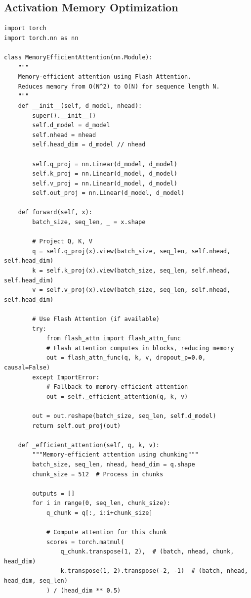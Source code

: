 \subsection{Activation Memory Optimization}

\begin{lstlisting}[style=python, caption=Techniques for reducing activation memory]
import torch
import torch.nn as nn

class MemoryEfficientAttention(nn.Module):
    """
    Memory-efficient attention using Flash Attention.
    Reduces memory from O(N^2) to O(N) for sequence length N.
    """
    def __init__(self, d_model, nhead):
        super().__init__()
        self.d_model = d_model
        self.nhead = nhead
        self.head_dim = d_model // nhead

        self.q_proj = nn.Linear(d_model, d_model)
        self.k_proj = nn.Linear(d_model, d_model)
        self.v_proj = nn.Linear(d_model, d_model)
        self.out_proj = nn.Linear(d_model, d_model)

    def forward(self, x):
        batch_size, seq_len, _ = x.shape

        # Project Q, K, V
        q = self.q_proj(x).view(batch_size, seq_len, self.nhead, self.head_dim)
        k = self.k_proj(x).view(batch_size, seq_len, self.nhead, self.head_dim)
        v = self.v_proj(x).view(batch_size, seq_len, self.nhead, self.head_dim)

        # Use Flash Attention (if available)
        try:
            from flash_attn import flash_attn_func
            # Flash attention computes in blocks, reducing memory
            out = flash_attn_func(q, k, v, dropout_p=0.0, causal=False)
        except ImportError:
            # Fallback to memory-efficient attention
            out = self._efficient_attention(q, k, v)

        out = out.reshape(batch_size, seq_len, self.d_model)
        return self.out_proj(out)

    def _efficient_attention(self, q, k, v):
        """Memory-efficient attention using chunking"""
        batch_size, seq_len, nhead, head_dim = q.shape
        chunk_size = 512  # Process in chunks

        outputs = []
        for i in range(0, seq_len, chunk_size):
            q_chunk = q[:, i:i+chunk_size]

            # Compute attention for this chunk
            scores = torch.matmul(
                q_chunk.transpose(1, 2),  # (batch, nhead, chunk, head_dim)
                k.transpose(1, 2).transpose(-2, -1)  # (batch, nhead, head_dim, seq_len)
            ) / (head_dim ** 0.5)


\end{lstlisting}

